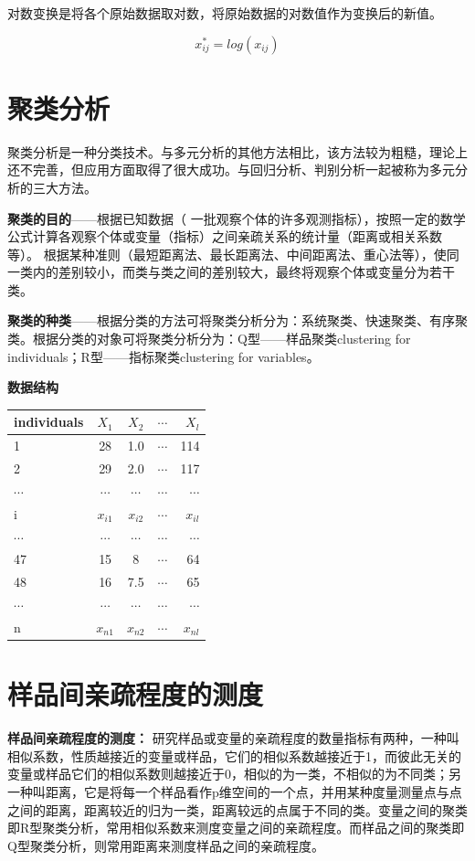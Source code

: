 \documentclass[]{ctexbook}
\begin{document}
对数变换是将各个原始数据取对数，将原始数据的对数值作为变换后的新值。

\[x_{ij}^*=log(x_{ij})\]

\hypertarget{ux805aux7c7bux5206ux6790}{%
\section{聚类分析}\label{ux805aux7c7bux5206ux6790}}

聚类分析是一种分类技术。与多元分析的其他方法相比，该方法较为粗糙，理论上还不完善，但应用方面取得了很大成功。与回归分析、判别分析一起被称为多元分析的三大方法。

\textbf{聚类的目的}------根据已知数据（ 一批观察个体的许多观测指标），按照一定的数学公式计算各观察个体或变量（指标）之间亲疏关系的统计量（距离或相关系数等）。 根据某种准则（最短距离法、最长距离法、中间距离法、重心法等），使同一类内的差别较小，而类与类之间的差别较大，最终将观察个体或变量分为若干类。

\textbf{聚类的种类}------根据分类的方法可将聚类分析分为：系统聚类、快速聚类、有序聚类。根据分类的对象可将聚类分析分为：Q型------样品聚类clustering for individuals；R型------指标聚类clustering for variables。

\textbf{数据结构}

\begin{longtable}[]{@{}lcccr@{}}
\toprule
individuals & \(X_1\) & \(X_2\) & \(\cdots\) & \(X_l\)\tabularnewline
\midrule
\endhead
1 & 28 & 1.0 & \(\cdots\) & 114\tabularnewline
2 & 29 & 2.0 & \(\cdots\) & 117\tabularnewline
\(\cdots\) & \(\cdots\) & \(\cdots\) & \(\cdots\) & \(\cdots\)\tabularnewline
i & \(x_{i1}\) & \(x_{i2}\) & \(\cdots\) & \(x_{il}\)\tabularnewline
\(\cdots\) & \(\cdots\) & \(\cdots\) & \(\cdots\) & \(\cdots\)\tabularnewline
47 & 15 & 8 & \(\cdots\) & 64\tabularnewline
48 & 16 & 7.5 & \(\cdots\) & 65\tabularnewline
\(\cdots\) & \(\cdots\) & \(\cdots\) & \(\cdots\) & \(\cdots\)\tabularnewline
n & \(x_{n1}\) & \(x_{n2}\) & \(\cdots\) & \(x_{nl}\)\tabularnewline
\bottomrule
\end{longtable}

\hypertarget{ux6837ux54c1ux95f4ux4eb2ux758fux7a0bux5ea6ux7684ux6d4bux5ea6}{%
\section{样品间亲疏程度的测度}\label{ux6837ux54c1ux95f4ux4eb2ux758fux7a0bux5ea6ux7684ux6d4bux5ea6}}

\textbf{样品间亲疏程度的测度：} 研究样品或变量的亲疏程度的数量指标有两种，一种叫相似系数，性质越接近的变量或样品，它们的相似系数越接近于1，而彼此无关的变量或样品它们的相似系数则越接近于0，相似的为一类，不相似的为不同类；另一种叫距离，它是将每一个样品看作p维空间的一个点，并用某种度量测量点与点之间的距离，距离较近的归为一类，距离较远的点属于不同的类。变量之间的聚类即R型聚类分析，常用相似系数来测度变量之间的亲疏程度。而样品之间的聚类即Q型聚类分析，则常用距离来测度样品之间的亲疏程度。
\end{document}
